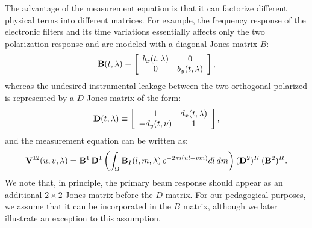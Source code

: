 The advantage of the measurement equation is that it can factorize different physical terms into different matrices. For example, the frequency response of the electronic filters and its time variations essentially affects only the two polarization response and are modeled with a diagonal Jones matrix $B$:
\begin{equation}
    {\bf B} (t,\lambda) \equiv 
    \left[
    \begin{array}{cc}
    b_x (t,\lambda) 	& 	0 	\\
    0 		& b_y (t,\lambda) 	\\
    \end{array}
    \right],   
\label{eq:sec:4}
\end{equation} 
whereas the undesired instrumental leakage between the two orthogonal polarized is represented by a $D$ Jones matrix of the form:
\begin{equation}
    {\bf D} (t,\lambda) \equiv 
    \left[
    \begin{array}{cc}
    1	 		& d_x (t,\lambda)	\\
    -d_y (t,\nu)	& 1 	\\
    \end{array}
    \right],   
\label{eq:sec:5}
\end{equation} 
and the measurement equation can be written as:
\begin{equation}
{\bf V}^{12} (u,v,\lambda) = {\bf B}^1 \, {\bf D}^1 \left( \int_\Omega {\bf B}_I (l, m, \lambda) \, e^{-2 \pi i (ul + vm)} dl \, dm  \right) ({\bf D}^2)^H  \, ({\bf B}^2)^H.
\label{eq:sec:6}
\end{equation}
We note that, in principle, the primary beam response should appear as an additional $2 \times 2$ Jones matrix before the $D$ matrix. For our pedagogical purposes, we assume that it can be incorporated in the $B$ matrix, although we later illustrate an exception to this assumption.

